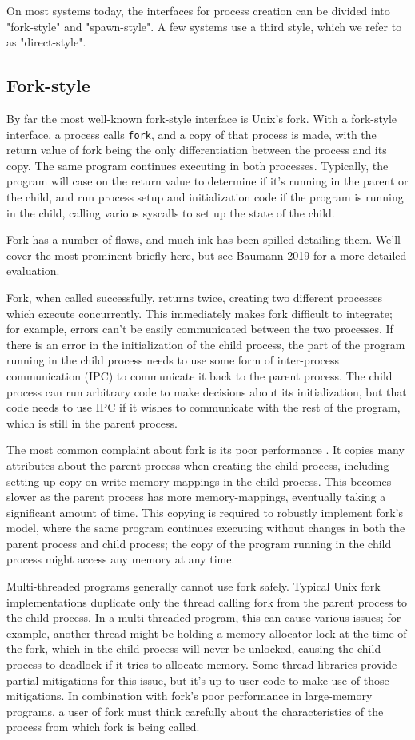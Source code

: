 \documentclass{acmart}
\begin{document}
On most systems today,
the interfaces for process creation
can be divided into "fork-style" and "spawn-style".
A few systems use a third style, which we refer to as "direct-style".
\subsection{Fork-style}
By far the most well-known fork-style interface is Unix's fork.\cite{forkhist}
With a fork-style interface,
a process calls \texttt{fork}, and a copy of that process is made,
with the return value of fork being the only differentiation between the process and its copy.
The same program continues executing in both processes.
Typically, the program will case on the return value to determine if it's running in the parent or the child,
and run process setup and initialization code if the program is running in the child,
calling various syscalls to set up the state of the child.

Fork has a number of flaws,
and much ink has been spilled detailing them.
We'll cover the most prominent briefly here,
but see Baumann 2019 \cite{forkroad} for a more detailed evaluation.

Fork, when called successfully, returns twice,
creating two different processes which execute concurrently.
This immediately makes fork difficult to integrate;
for example, errors can't be easily communicated between the two processes.
If there is an error in the initialization of the child process,
the part of the program running in the child process
needs to use some form of inter-process communication (IPC) to communicate it back to the parent process.
The child process can run arbitrary code to make decisions about its initialization,
but that code needs to use IPC if it wishes to communicate with the rest of the program,
which is still in the parent process.

The most common complaint about fork is its poor performance \cite{forkroad}.
It copies many attributes about the parent process when creating the child process,
including setting up copy-on-write memory-mappings in the child process.
This becomes slower as the parent process has more memory-mappings,
eventually taking a significant amount of time.
This copying is required to robustly implement fork's model,
where the same program continues executing without changes in both the parent process and child process;
the copy of the program running in the child process might access any memory at any time.

Multi-threaded programs generally cannot use fork safely.
Typical Unix fork implementations duplicate only the thread calling fork from the parent process to the child process.
In a multi-threaded program, this can cause various issues;
for example, another thread might be holding a memory allocator lock at the time of the fork,
which in the child process will never be unlocked,
causing the child process to deadlock if it tries to allocate memory.
Some thread libraries provide partial mitigations for this issue,
but it's up to user code to make use of those mitigations.
In combination with fork's poor performance in large-memory programs,
a user of fork must think carefully
about the characteristics of the process from which fork is being called.
\end{document}
